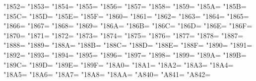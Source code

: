 \XeTeXcharclass"1852=\KclassArabD
\XeTeXcharclass"1853=\KclassArabD
\XeTeXcharclass"1854=\KclassArabD
\XeTeXcharclass"1855=\KclassArabD
\XeTeXcharclass"1856=\KclassArabD
\XeTeXcharclass"1857=\KclassArabD
\XeTeXcharclass"1858=\KclassArabD
\XeTeXcharclass"1859=\KclassArabD
\XeTeXcharclass"185A=\KclassArabD
\XeTeXcharclass"185B=\KclassArabD
\XeTeXcharclass"185C=\KclassArabD
\XeTeXcharclass"185D=\KclassArabD
\XeTeXcharclass"185E=\KclassArabD
\XeTeXcharclass"185F=\KclassArabD
\XeTeXcharclass"1860=\KclassArabD
\XeTeXcharclass"1861=\KclassArabD
\XeTeXcharclass"1862=\KclassArabD
\XeTeXcharclass"1863=\KclassArabD
\XeTeXcharclass"1864=\KclassArabD
\XeTeXcharclass"1865=\KclassArabD
\XeTeXcharclass"1866=\KclassArabD
\XeTeXcharclass"1867=\KclassArabD
\XeTeXcharclass"1868=\KclassArabD
\XeTeXcharclass"1869=\KclassArabD
\XeTeXcharclass"186A=\KclassArabD
\XeTeXcharclass"186B=\KclassArabD
\XeTeXcharclass"186C=\KclassArabD
\XeTeXcharclass"186D=\KclassArabD
\XeTeXcharclass"186E=\KclassArabD
\XeTeXcharclass"186F=\KclassArabD
\XeTeXcharclass"1870=\KclassArabD
\XeTeXcharclass"1871=\KclassArabD
\XeTeXcharclass"1872=\KclassArabD
\XeTeXcharclass"1873=\KclassArabD
\XeTeXcharclass"1874=\KclassArabD
\XeTeXcharclass"1875=\KclassArabD
\XeTeXcharclass"1876=\KclassArabD
\XeTeXcharclass"1877=\KclassArabD
\XeTeXcharclass"1878=\KclassArabD
\XeTeXcharclass"1887=\KclassArabD
\XeTeXcharclass"1888=\KclassArabD
\XeTeXcharclass"1889=\KclassArabD
\XeTeXcharclass"188A=\KclassArabD
\XeTeXcharclass"188B=\KclassArabD
\XeTeXcharclass"188C=\KclassArabD
\XeTeXcharclass"188D=\KclassArabD
\XeTeXcharclass"188E=\KclassArabD
\XeTeXcharclass"188F=\KclassArabD
\XeTeXcharclass"1890=\KclassArabD
\XeTeXcharclass"1891=\KclassArabD
\XeTeXcharclass"1892=\KclassArabD
\XeTeXcharclass"1893=\KclassArabD
\XeTeXcharclass"1894=\KclassArabD
\XeTeXcharclass"1895=\KclassArabD
\XeTeXcharclass"1896=\KclassArabD
\XeTeXcharclass"1897=\KclassArabD
\XeTeXcharclass"1898=\KclassArabD
\XeTeXcharclass"1899=\KclassArabD
\XeTeXcharclass"189A=\KclassArabD
\XeTeXcharclass"189B=\KclassArabD
\XeTeXcharclass"189C=\KclassArabD
\XeTeXcharclass"189D=\KclassArabD
\XeTeXcharclass"189E=\KclassArabD
\XeTeXcharclass"189F=\KclassArabD
\XeTeXcharclass"18A0=\KclassArabD
\XeTeXcharclass"18A1=\KclassArabD
\XeTeXcharclass"18A2=\KclassArabD
\XeTeXcharclass"18A3=\KclassArabD
\XeTeXcharclass"18A4=\KclassArabD
\XeTeXcharclass"18A5=\KclassArabD
\XeTeXcharclass"18A6=\KclassArabD
\XeTeXcharclass"18A7=\KclassArabD
\XeTeXcharclass"18A8=\KclassArabD
\XeTeXcharclass"18AA=\KclassArabD
\XeTeXcharclass"A840=\KclassArabD
\XeTeXcharclass"A841=\KclassArabD
\XeTeXcharclass"A842=\KclassArabD
